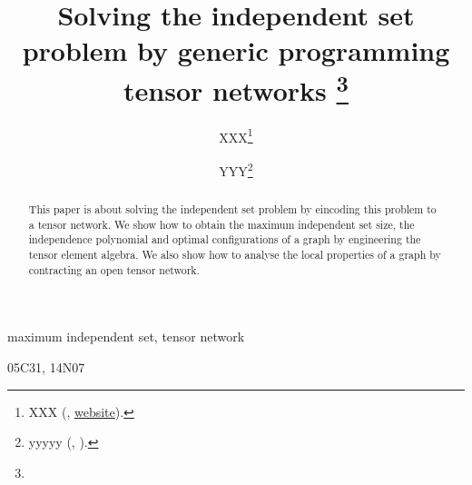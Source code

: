 \documentclass[review,onefignum,onetabnum]{siamart190516}
\title{Solving the independent set problem by generic programming tensor networks
\thanks{\funding{...}}
}
\author{XXX\thanks{XXX 
  (\email{email}, \url{website}).}
\and YYY\thanks{yyyyy 
  (\email{yyyy}, \email{email}).}
}
\newcommand{\<}{\langle}
\renewcommand{\>}{\rangle}
\begin{document}
\maketitle

\begin{abstract}
	This paper is about solving the independent set problem by eincoding this problem to a tensor network. 
    We show how to obtain the maximum independent set size, the independence polynomial and optimal configurations of a graph by engineering the tensor element algebra.
    We also show how to analyse the local properties of a graph by contracting an open tensor network.
\end{abstract}

\begin{keywords}
  maximum independent set, tensor network
\end{keywords}

\begin{AMS}
  05C31, 14N07
\end{AMS}
\end{document}
